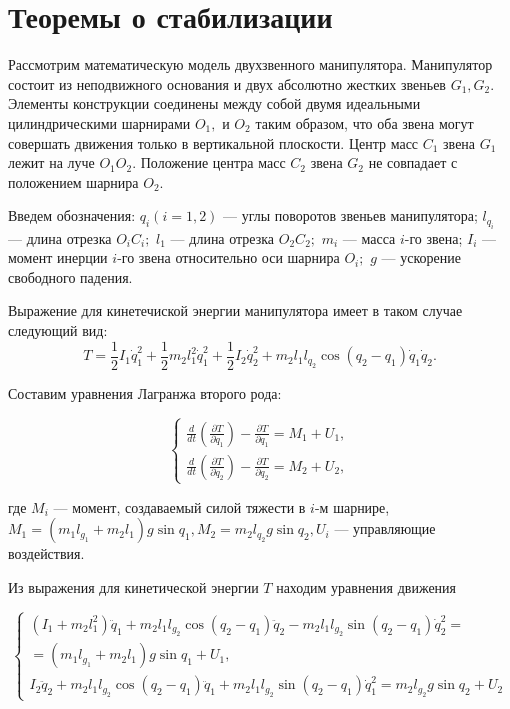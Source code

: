 \section{Теоремы о стабилизации} \label{p21}

Рассмотрим математическую модель двухзвенного манипулятора. Манипулятор состоит из неподвижного основания и двух абсолютно жестких звеньев $G_1, G_2$. Элементы конструкции соединены между собой двумя идеальными цилиндрическими шарнирами $O_1,$ и $O_2$ таким образом, что оба звена могут совершать движения только в вертикальной плоскости. Центр масс $C_1$ звена $G_1$ лежит на луче $O_1 O_2.$ Положение центра масс $C_2$ звена $G_2$ не совпадает с положением шарнира $O_2$.

Введем обозначения: $q_i (i=1, 2)$ --- углы поворотов звеньев манипулятора; $l_{q_i}$ --- длина отрезка $O_i C_i;$ $l_1$ --- длина отрезка $O_2 C_2;$ $m_i$  ---  масса   $i$-го звена;   $I_i$ --- момент инерции  $i$-го звена относительно оси шарнира $O_i;$ $g$ --- ускорение свободного падения.

Выражение для кинетечиской энергии манипулятора имеет в таком случае следующий вид:
\begin{equation}
T = \frac{1}{2} I_1 \dot q_1^2 + \frac12 m_2 l_1^2 \dot q_1^2 + \frac12 I_2 \dot q_2^2 + m_2 l_1 l_{q_2} \cos (q_2 - q_1) \dot q_1 \dot q_2.
\end{equation}

Составим уравнения Лагранжа второго рода:

\begin{equation}
\begin{cases}
\frac{d}{dt} (\frac{\partial T}{\partial \dot q_1}) - \frac{\partial T}{\partial q_1} = M_1 + U_1, 
\\
\frac{d}{dt} (\frac{\partial T}{\partial \dot q_2}) - \frac{\partial T}{\partial q_2} = M_2 + U_2,
\end{cases}
\end{equation}

где $M_i$ --- момент, создаваемый силой тяжести в $i$-м шарнире, $M_1 = (m_1 l_{g_1} + m_2 l_1) g \sin q_1, M_2 = m_2 l_{q_2} g \sin q_2, U_i $ --- управляющие воздействия.

Из выражения для кинетической энергии $T$ находим уравнения движения

\begin{equation}\label{2.1'}
\begin{cases}
(I_1 + m_2 l_1^2) \ddot q_1 + m_2 l_1 l_{g_2} \cos(q_2 - q_1) \ddot q_2 - m_2 l_1 l_{g_2} \sin(q_2 - q_1) \dot q_2^2 = \\ = (m_1 l_{g_1} + m_2 l_1) g \sin q_1 + U_1,
\\
I_2 \ddot q_2 + m_2 l_1 l_{g_2} \cos(q_2 - q_1) \ddot q_1 + m_2 l_1 l_{g_2} \sin(q_2 - q_1) \dot q_1^2 = m_2 l_{g_2} g \sin q_2 + U_2
\end{cases}
\end{equation}

